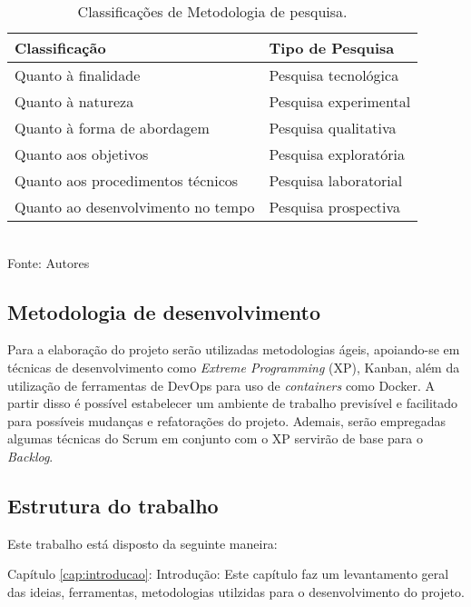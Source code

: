 \setlength{\extrarowheight}{5pt}

\begin{table}
    \centering
    \caption{Classificações de Metodologia de pesquisa.}
    \begin{tabular}{|l|l|}
        \hline
        \textbf{Classificação}            & \textbf{Tipo de Pesquisa}\\ 
        \hline
        Quanto à finalidade               & Pesquisa tecnológica \\ 
        \hline
        Quanto à natureza                 & Pesquisa experimental \\ 
        \hline
        Quanto à forma de abordagem       & Pesquisa qualitativa \\
        \hline
        Quanto aos objetivos              & Pesquisa exploratória \\
        \hline
        Quanto aos procedimentos técnicos & Pesquisa laboratorial \\        
        \hline
        Quanto ao desenvolvimento no tempo & Pesquisa prospectiva \\     
    \end{tabular}
    \label{tab:tipo_pesquisa}
    \vspace{5mm} \\ 
    {\footnotesize Fonte: Autores}
\end{table}

\subsection{Metodologia de desenvolvimento}

Para a elaboração do projeto serão utilizadas metodologias ágeis, apoiando-se em técnicas de desenvolvimento como \textit{Extreme Programming} (XP), Kanban, além da utilização de ferramentas de DevOps para uso de \textit{containers} como Docker. A partir disso é possível estabelecer um ambiente de trabalho previsível e facilitado para possíveis mudanças e refatorações do projeto. Ademais, serão empregadas algumas técnicas do Scrum em conjunto com o XP servirão de base para o \textit{Backlog}.

\subsection{Estrutura do trabalho}

Este trabalho está disposto da seguinte maneira:

Capítulo \ref{cap:introducao}: Introdução: Este capítulo faz um levantamento geral das ideias, ferramentas, metodologias utilzidas para o desenvolvimento do projeto.

